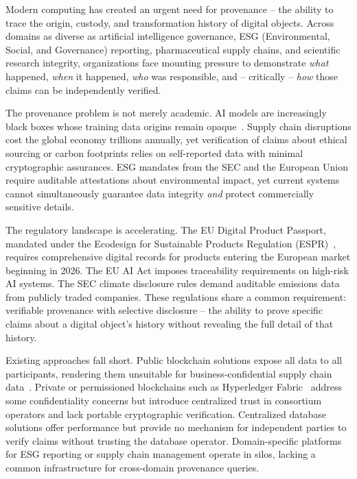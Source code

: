 \documentclass[conference]{IEEEtran}
\begin{document}
Modern computing has created an urgent need for provenance -- the ability to
trace the origin, custody, and transformation history of digital objects.
Across domains as diverse as artificial intelligence governance, ESG
(Environmental, Social, and Governance) reporting, pharmaceutical supply
chains, and scientific research integrity, organizations face mounting pressure
to demonstrate \emph{what} happened, \emph{when} it happened, \emph{who} was
responsible, and -- critically -- \emph{how} those claims can be independently
verified.

The provenance problem is not merely academic.  AI models are increasingly
black boxes whose training data origins remain opaque~\cite{tramer2016}.
Supply chain disruptions cost the global economy trillions annually, yet
verification of claims about ethical sourcing or carbon footprints relies on
self-reported data with minimal cryptographic assurances. ESG mandates from the
SEC and the European Union require auditable attestations about environmental
impact, yet current systems cannot simultaneously guarantee data integrity
\emph{and} protect commercially sensitive details.

The regulatory landscape is accelerating.  The EU Digital Product Passport,
mandated under the Ecodesign for Sustainable Products Regulation
(ESPR)~\cite{eu2024}, requires comprehensive digital records for products
entering the European market beginning in 2026.  The EU AI Act imposes
traceability requirements on high-risk AI systems.  The SEC climate disclosure
rules demand auditable emissions data from publicly traded companies.  These
regulations share a common requirement: verifiable provenance with selective
disclosure -- the ability to prove specific claims about a digital object's
history without revealing the full detail of that history.

Existing approaches fall short.  Public blockchain solutions expose all data to
all participants, rendering them unsuitable for business-confidential supply
chain data~\cite{eberhardt2017,xu2017}.  Private or permissioned blockchains
such as Hyperledger Fabric~\cite{androulaki2018} address some confidentiality
concerns but introduce centralized trust in consortium operators and lack
portable cryptographic verification.  Centralized database solutions offer
performance but provide no mechanism for independent parties to verify claims
without trusting the database operator.  Domain-specific platforms for ESG
reporting or supply chain management operate in silos, lacking a common
infrastructure for cross-domain provenance queries.
\end{document}
